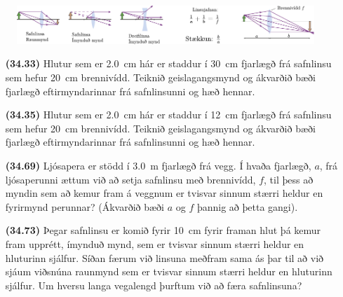 \ifdefined \wholebook \else\documentclass[oneside]{book}\usepackage{EdlBook}\graphicspath{{figures/}}
\begin{document}
\begin{tcolorbox}
\begin{figure}[H]
    \centering
    \includegraphics{figures/geislagangur.pdf}
\end{figure}

\end{tcolorbox}

\begin{enumerate}[label = \textbf{(\alph*)}]


\item[\textbf{(34.33)}] Hlutur sem er \SI{2.0}{cm} hár er staddur í \SI{30}{cm} fjarlægð frá safnlinsu sem hefur \SI{20}{cm} brennivídd. Teiknið geislagangsmynd og ákvarðið bæði fjarlægð eftirmyndarinnar frá safnlinsunni og hæð hennar.

\item[\textbf{(34.35)}] Hlutur sem er \SI{2.0}{cm} hár er staddur í \SI{12}{cm} fjarlægð frá safnlinsu sem hefur \SI{20}{cm} brennivídd. Teiknið geislagangsmynd og ákvarðið bæði fjarlægð eftirmyndarinnar frá safnlinsunni og hæð hennar.

\item[\textbf{(34.69)}] Ljósapera er stödd í \SI{3.0}{m} fjarlægð frá vegg. Í hvaða fjarlægð, $a$, frá ljósaperunni ættum við að setja safnlinsu með brennivídd, $f$, til þess að myndin sem að kemur fram á veggnum er tvisvar sinnum stærri heldur en fyrirmynd perunnar? (Ákvarðið bæði $a$ og $f$ þannig að þetta gangi).

\item[\textbf{(34.73)}] Þegar safnlinsu er komið fyrir \SI{10}{cm} fyrir framan hlut þá kemur fram upprétt, ímynduð mynd, sem er tvisvar sinnum stærri heldur en hluturinn sjálfur. Síðan færum við linsuna meðfram sama ás þar til að við sjáum viðsnúna raunmynd sem er tvisvar sinnum stærri heldur en hluturinn sjálfur. Um hversu langa vegalengd þurftum við að færa safnlinsuna?

\end{enumerate}
\end{document}
